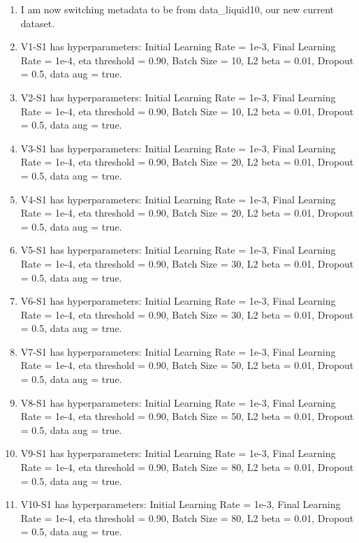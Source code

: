 \documentclass[12pt,reqno]{amsart}
\numberwithin{equation}{section}
\begin{document}
\begin{enumerate}
\item I am now switching metadata to be from data\_liquid10, our new current dataset.  

\item V1-S1 has hyperparameters:  Initial Learning Rate = 1e-3, Final Learning Rate = 1e-4, eta threshold = 0.90, Batch Size = 10, L2 beta = 0.01, Dropout = 0.5, data aug = true.

\item V2-S1 has hyperparameters:  Initial Learning Rate = 1e-3, Final Learning Rate = 1e-4, eta threshold = 0.90, Batch Size = 10, L2 beta = 0.01, Dropout = 0.5, data aug = true.    

\item V3-S1 has hyperparameters:  Initial Learning Rate = 1e-3, Final Learning Rate = 1e-4, eta threshold = 0.90, Batch Size = 20, L2 beta = 0.01, Dropout = 0.5, data aug = true. 

\item V4-S1 has hyperparameters:  Initial Learning Rate = 1e-3, Final Learning Rate = 1e-4, eta threshold = 0.90, Batch Size = 20, L2 beta = 0.01, Dropout = 0.5, data aug = true.  

\item V5-S1 has hyperparameters:  Initial Learning Rate = 1e-3, Final Learning Rate = 1e-4, eta threshold = 0.90, Batch Size = 30, L2 beta = 0.01, Dropout = 0.5, data aug = true. 

\item V6-S1 has hyperparameters:  Initial Learning Rate = 1e-3, Final Learning Rate = 1e-4, eta threshold = 0.90, Batch Size = 30, L2 beta = 0.01, Dropout = 0.5, data aug = true. 

\item V7-S1 has hyperparameters:  Initial Learning Rate = 1e-3, Final Learning Rate = 1e-4, eta threshold = 0.90, Batch Size = 50, L2 beta = 0.01, Dropout = 0.5, data aug = true. 

\item V8-S1 has hyperparameters:  Initial Learning Rate = 1e-3, Final Learning Rate = 1e-4, eta threshold = 0.90, Batch Size = 50, L2 beta = 0.01, Dropout = 0.5, data aug = true. 

\item V9-S1 has hyperparameters:  Initial Learning Rate = 1e-3, Final Learning Rate = 1e-4, eta threshold = 0.90, Batch Size = 80, L2 beta = 0.01, Dropout = 0.5, data aug = true. 

\item V10-S1 has hyperparameters:  Initial Learning Rate = 1e-3, Final Learning Rate = 1e-4, eta threshold = 0.90, Batch Size = 80, L2 beta = 0.01, Dropout = 0.5, data aug = true. 


\end{enumerate}
\end{document}
